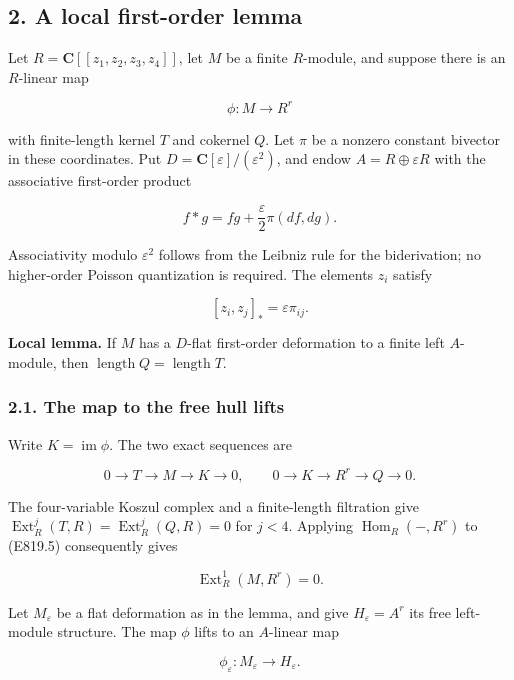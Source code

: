 \subsection{2. A local first-order
lemma}\label{SF-E819-a-local-first-order-lemma}

Let \(R=\mathbf C[[z_1,z_2,z_3,z_4]]\), let \(M\) be a finite
\(R\)-module, and suppose there is an \(R\)-linear map

\[
 \phi:M\longrightarrow R^r
\]

with finite-length kernel \(T\) and cokernel \(Q\). Let \(\pi\) be a
nonzero constant bivector in these coordinates. Put
\(D=\mathbf C[\varepsilon]/(\varepsilon^2)\), and endow
\(A=R\oplus\varepsilon R\) with the associative first-order product

\[
 f*g=fg+\frac{\varepsilon}{2}\pi(df,dg).
 \tag{E819.3}
\]

Associativity modulo \(\varepsilon^2\) follows from the Leibniz rule for
the biderivation; no higher-order Poisson quantization is required. The
elements \(z_i\) satisfy

\[
 [z_i,z_j]_* =\varepsilon\pi_{ij}.
 \tag{E819.4}
\]

\textbf{Local lemma.} If \(M\) has a \(D\)-flat first-order deformation
to a finite left \(A\)-module, then
\(\operatorname{length}Q=\operatorname{length}T\).

\subsubsection{2.1. The map to the free hull
lifts}\label{SF-E819-the-map-to-the-free-hull-lifts}

Write \(K=\operatorname{im}\phi\). The two exact sequences are

\[
 0\to T\to M\to K\to0,
 \qquad 0\to K\to R^r\to Q\to0.
 \tag{E819.5}
\]

The four-variable Koszul complex and a finite-length filtration give
\(\operatorname{Ext}^j_R(T,R)=\operatorname{Ext}^j_R(Q,R)=0\) for
\(j<4\). Applying \(\operatorname{Hom}_R(-,R^r)\) to (E819.5)
consequently gives

\[
 \operatorname{Ext}^1_R(M,R^r)=0.
 \tag{E819.6}
\]

Let \(M_\varepsilon\) be a flat deformation as in the lemma, and give
\(H_\varepsilon=A^r\) its free left-module structure. The map \(\phi\)
lifts to an \(A\)-linear map

\[
 \phi_\varepsilon:M_\varepsilon\longrightarrow H_\varepsilon.
 \tag{E819.7}
\]

